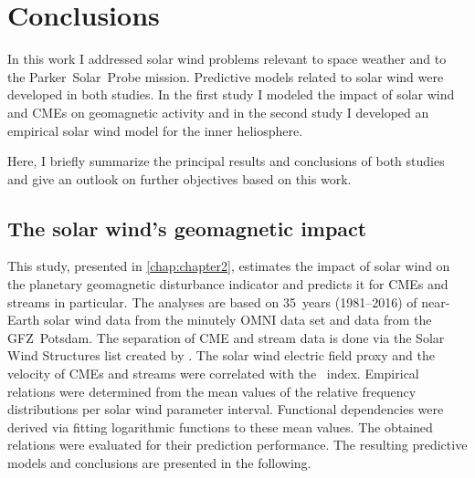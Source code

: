 
\chapter{Conclusions}
\label{chap:summary}

In this work I addressed solar wind problems relevant to space weather and to the Parker~Solar~Probe mission. Predictive models related to solar wind were developed in both studies. In the first study I modeled the impact of solar wind and CMEs on geomagnetic activity and in the second study I developed an empirical solar wind model for the inner heliosphere.

Here, I briefly summarize the principal results and conclusions of both studies and give an outlook on further objectives based on this work.

\section{The solar wind's geomagnetic impact}
This study, presented in \autoref{chap:chapter2}, estimates the impact of solar wind on the planetary geomagnetic disturbance indicator \Kp{} and predicts it for CMEs and streams in particular.
The analyses are based on 35~years (1981--2016) of near-Earth solar wind data from the minutely OMNI data set and \Kp{} data from the GFZ~Potsdam. The separation of CME and stream data is done via the Solar Wind Structures list created by \citet{Richardson2000}.
The solar wind electric field proxy \vBz{} and the velocity of CMEs and streams were correlated with the \Kp~index. Empirical relations were determined from the mean values of the relative \Kp{} frequency distributions per solar wind parameter interval. Functional dependencies were derived via fitting logarithmic functions to these mean \Kp{} values.
The obtained \Kp{} relations were evaluated for their prediction performance. The resulting predictive models and conclusions are presented in the following.

